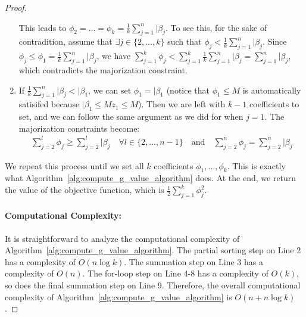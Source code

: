 \begin{proof}
\begin{enumerate}
    This leads to $\phi_2 = \ldots = \phi_k = \frac{1}{k} \sum_{j=1}^n \vert{\beta_j}$.
    To see this, for the sake of contradition, assume that $\exists j \in \{2, \ldots, k\}$ such that $\phi_j < \frac{1}{k} \sum_{j=1}^n \vert{\beta_j}$. 
    Since $\phi_j \leq \phi_1 = \frac{1}{k} \sum_{j=1}^n \vert{\beta_j}$, we have $\sum_{j=1}^k \phi_j < \sum_{j=1}^k \frac{1}{k} \sum_{j=1}^n \vert{\beta_j} = \sum_{j=1}^n \vert{\beta_j}$, which contradicts the majorization constraint.
    
    \item If $\frac{1}{k} \sum_{j=1}^n \vert{\beta_j} < \vert{\beta_1}$, we can set $\phi_1 = \vert{\beta_1}$ (notice that $\phi_1 \leq M$ is automatically satisifed because $\vert{\beta_1} \leq M z_1 \leq M$).
    Then we are left with $k-1$ coefficients to set, and we can follow the same argument as we did for when $j=1$.
    The majorization constraints become:
    \begin{align}
        \sum_{j=2}^l \phi_j \geq \sum_{j=2}^l \vert{\beta_j} \quad \forall l \in \{2, \ldots, n-1\} \quad \text{and} \quad \sum_{j=2}^n \phi_j = \sum_{j=2}^n \vert{\beta_j}
    \end{align}
\end{enumerate}
We repeat this process until we set all $k$ coefficients $\phi_1, \ldots, \phi_k$.
This is exactly what Algorithm~\ref{alg:compute_g_value_algorithm} does.
At the end, we return the value of the objective function, which is $\frac{1}{2} \sum_{j=1}^{k} \phi_j^2$.

\paragraph{Computational Complexity:}
It is straightforward to analyze the computational complexity of Algorithm~\ref{alg:compute_g_value_algorithm}.
The partial sorting step on Line 2 has a complexity of $O(n \log k)$.
The summation step on Line 3 has a complexity of $O(n)$.
The for-loop step on Line 4-8 has a complexity of $O(k)$, so does the final summation step on Line 9.
Therefore, the overall computational complexity of Algorithm~\ref{alg:compute_g_value_algorithm} is $O(n + n \log k)$.

\end{proof}
